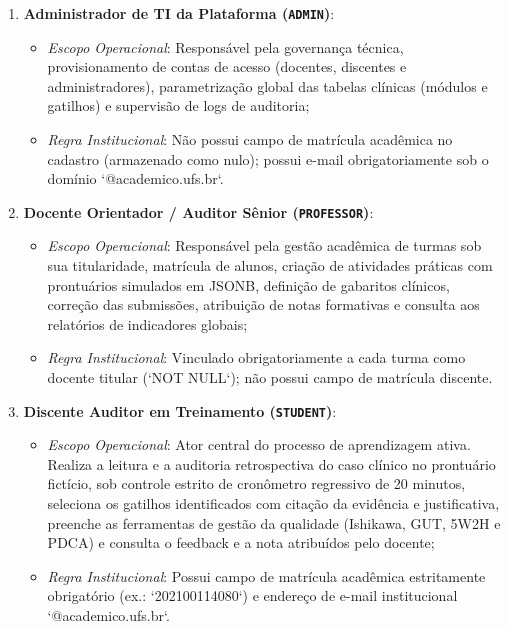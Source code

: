 \begin{enumerate}
    \item \textbf{Administrador de TI da Plataforma (\texttt{ADMIN})}:
    \begin{itemize}
        \item \textit{Escopo Operacional}: Responsável pela governança técnica, provisionamento de contas de acesso (docentes, discentes e administradores), parametrização global das tabelas clínicas (módulos e gatilhos) e supervisão de logs de auditoria;
        \item \textit{Regra Institucional}: Não possui campo de matrícula acadêmica no cadastro (armazenado como nulo); possui e-mail obrigatoriamente sob o domínio `@academico.ufs.br`.
    \end{itemize}

    \item \textbf{Docente Orientador / Auditor Sênior (\texttt{PROFESSOR})}:
    \begin{itemize}
        \item \textit{Escopo Operacional}: Responsável pela gestão acadêmica de turmas sob sua titularidade, matrícula de alunos, criação de atividades práticas com prontuários simulados em JSONB, definição de gabaritos clínicos, correção das submissões, atribuição de notas formativas e consulta aos relatórios de indicadores globais;
        \item \textit{Regra Institucional}: Vinculado obrigatoriamente a cada turma como docente titular (`NOT NULL`); não possui campo de matrícula discente.
    \end{itemize}

    \item \textbf{Discente Auditor em Treinamento (\texttt{STUDENT})}:
    \begin{itemize}
        \item \textit{Escopo Operacional}: Ator central do processo de aprendizagem ativa. Realiza a leitura e a auditoria retrospectiva do caso clínico no prontuário fictício, sob controle estrito de cronômetro regressivo de 20 minutos, seleciona os gatilhos identificados com citação da evidência e justificativa, preenche as ferramentas de gestão da qualidade (Ishikawa, GUT, 5W2H e PDCA) e consulta o feedback e a nota atribuídos pelo docente;
        \item \textit{Regra Institucional}: Possui campo de matrícula acadêmica estritamente obrigatório (ex.: `202100114080`) e endereço de e-mail institucional `@academico.ufs.br`.
    \end{itemize}


\end{enumerate}
